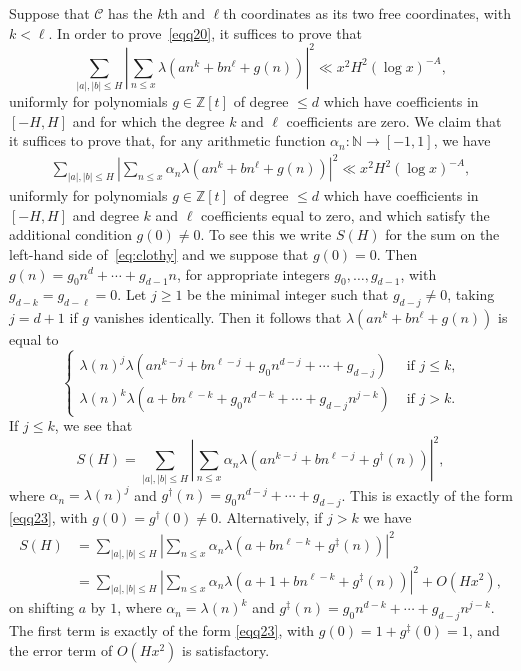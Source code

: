 \documentclass[11pt,letterpaper]{amsart}
\renewcommand{\leq}{\leqslant}
\renewcommand{\geq}{\geqslant}
\theoremstyle{definition}
\numberwithin{equation}{section}
\newcommand\NN{\mathbb{N}}
\newcommand{\0}{\mathbf{0}}
\begin{document}
Suppose that  $\mathscr{C}$ has the $k$th and $\ell$th coordinates as its two free coordinates, with $k<\ell$. 
In order
to prove~\eqref{eqq20}, it suffices to prove that 
\begin{equation}\label{eq:clothy}
\sum_{|a|,|b|\leq H}\left|\sum_{n\leq x}\lambda(an^k+bn^{\ell}+g(n))\right|^2\ll x^2H^2(\log x)^{-A},
\end{equation}
uniformly for polynomials $g\in \mathbb{Z}[t]$ of degree $\leq d$ which have  coefficients in $[-H,H]$ and for which the degree $k$ and $\ell$ coefficients are zero.
We claim that it suffices to prove that, for any arithmetic 
function $\alpha_n: \NN\to  [-1,1]$, we have 
\begin{align}\label{eqq23}
\sum_{|a|,|b|\leq H}\left|\sum_{n\leq x}\alpha_n\lambda(an^k+bn^{\ell}+g(n))\right|^2\ll x^2H^2(\log x)^{-A},
\end{align}
uniformly for polynomials $g\in \mathbb{Z}[t]$ of degree $\leq d$ which have  coefficients in $[-H,H]$ and degree $k$ and $\ell$ coefficients equal to zero, and  which satisfy the additional condition $g(0)\neq 0$. To see this we write $S(H)$ for the sum on the left-hand side of~\eqref{eq:clothy} and we suppose that  $g(0)=0$. Then 
$g(n)=g_0n^d+\cdots +g_{d-1}n$, for appropriate integers $g_0,\dots,g_{d-1}$, with $g_{d-k}=g_{d-\ell}=0$.
Let $j\geq 1$ be the minimal integer such that  $g_{d-j}\neq 0$, taking 
$j=d+1$ if $g$ vanishes identically.  Then it follows that
$\lambda(an^{k}+bn^{\ell}+g(n))$ is equal to
$$
\begin{cases}
\lambda(n)^j\lambda(an^{k-j}+bn^{\ell-j}+g_0n^{d-j}+\cdots+g_{d-j}) & \text{ if $j\leq k$,}\\
\lambda(n)^k\lambda(a+bn^{\ell-k}+g_0n^{d-k}+\cdots+g_{d-j}n^{j-k}) & \text{ if $j> k$.}
\end{cases}
$$
If $j\leq k$,  we see that 
$$
S(H)=
\sum_{|a|,|b|\leq H}\left|\sum_{n\leq x}\alpha_n 
\lambda(an^{k-j}+bn^{\ell-j}+g^\dag(n))\right|^2,
$$
where $\alpha_n=\lambda(n)^j$ and $g^\dag(n)= g_0n^{d-j}+\cdots+g_{d-j}$.
This is exactly of the form 
\eqref{eqq23}, 
with $g(0)= g^\dag(0)\neq 0$.
Alternatively, if $j>k$ we have
\begin{align*}
S(H)
&=
\sum_{|a|,|b|\leq H}\left|\sum_{n\leq x}\alpha_n 
\lambda(a+bn^{\ell-k}+g^\ddag(n))\right|^2\\&=
\sum_{|a|,|b|\leq H}\left|\sum_{n\leq x}\alpha_n 
\lambda(a+1+bn^{\ell-k}+ g^\ddag(n))\right|^2 +O(Hx^2),
\end{align*}
on shifting $a$ by $1$, 
where $\alpha_n=\lambda(n)^k$ and $g^\ddag(n)= g_0n^{d-k}+\cdots+g_{d-j}n^{j-k}$.
The first term 
is exactly of the form 
\eqref{eqq23}, 
with $g(0)=1+ g^\ddag(0)=1$,
and the error term of $O(Hx^2)$ is satisfactory.
\end{document}
